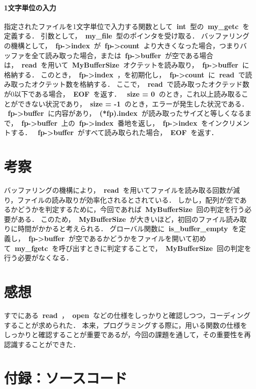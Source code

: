 \documentclass[12pt]{jlreq}
\renewcommand{\texttt}[1]{{\ttfamily\bfseries\ #1\ }}
\begin{document}
\paragraph{1文字単位の入力}
指定されたファイルを1文字単位で入力する関数として\texttt{int}型の\texttt{my\_getc}を定義する．
引数として，\texttt{my\_file}型のポインタを受け取る．
バッファリングの機構として，\texttt{fp->index}が\texttt{fp->count}より大きくなった場合，つまりバッファを全て読み取った場合，または\texttt{fp->buffer}が空である場合は，\texttt{read}を用いて\texttt{MyBufferSize}オクテットを読み取り，\texttt{fp->buffer}に格納する．
このとき，\texttt{fp->index}，を初期化し，\texttt{fp->count}に\texttt{read}で読み取ったオクテット数を格納する．
ここで，\texttt{read}で読み取ったオクテッド数が0以下である場合，\texttt{EOF}を返す．
\texttt{size =  0}のとき，これ以上読み取ることができない状況であり，\texttt{size = -1}のとき，エラーが発生した状況である．
\texttt{fp->buffer}に内容があり，\texttt{(*fp).index}が読み取ったサイズと等しくなるまで，\texttt{fp->buffer}上の\texttt{fp->index}番地を返し，\texttt{fp->index}をインクリメントする．
\texttt{fp->buffer}がすべて読み取られた場合，\texttt{EOF}を返す．

\section*{考察}
バッファリングの機構により，\texttt{read}を用いてファイルを読み取る回数が減り，ファイルの読み取りが効率化されるとされている．
しかし，配列が空であるかどうかを判定するために，今回であれば\texttt{MyBufferSize}回の判定を行う必要がある．
このため，\texttt{MyBufferSize}が大きいほど，初回のファイル読み取りに時間がかかると考えられる．
グローバル関数に\texttt{is\_buffer\_empty}を定義し，\texttt{fp->buffer}が空であるかどうかをファイルを開いて初めて\texttt{my\_fgetc}を呼び出すときに判定することで，\texttt{MyBufferSize}回の判定を行う必要がなくなる．

\section*{感想}
すでにある\texttt{read}，\texttt{open}などの仕様をしっかりと確認しつつ，コーディングすることが求められた．
本来，プログラミングする際に，用いる関数の仕様をしっかりと確認することが重要であるが，今回の課題を通して，その重要性を再認識することができた．
\newpage
\section*{付録：ソースコード}
\label{apendix}


\end{document}
